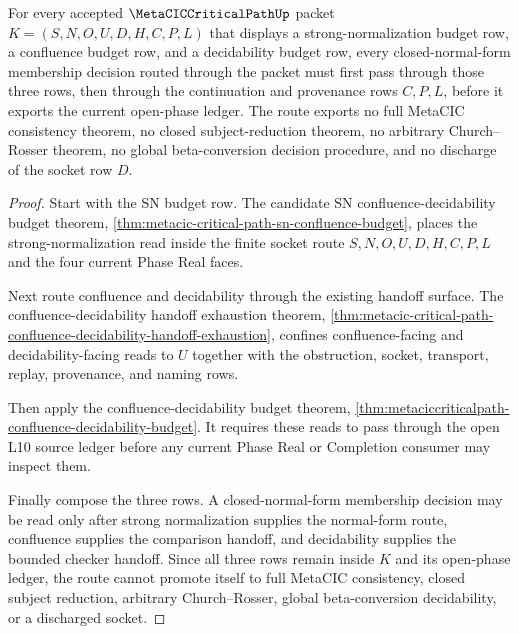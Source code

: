 \begin{theorem}
\label{thm:metacic-critical-path-sn-confluence-decidability-handoff}
For every accepted $\MetaCICCriticalPathUp$ packet $K=(S,N,O,U,D,H,C,P,L)$ that displays a strong-normalization budget row, a confluence budget row, and a decidability budget row, every closed-normal-form membership decision routed through the packet must first pass through those three rows, then through the continuation and provenance rows $C,P,L$, before it exports the current open-phase ledger. The route exports no full MetaCIC consistency theorem, no closed subject-reduction theorem, no arbitrary Church--Rosser theorem, no global beta-conversion decision procedure, and no discharge of the socket row $D$.
\end{theorem}
\begin{proof}
Start with the SN budget row. The candidate SN confluence-decidability budget theorem, \autoref{thm:metacic-critical-path-sn-confluence-budget}, places the strong-normalization read inside the finite socket route $S,N,O,U,D,H,C,P,L$ and the four current Phase Real faces.

Next route confluence and decidability through the existing handoff surface. The confluence-decidability handoff exhaustion theorem, \autoref{thm:metacic-critical-path-confluence-decidability-handoff-exhaustion}, confines confluence-facing and decidability-facing reads to $U$ together with the obstruction, socket, transport, replay, provenance, and naming rows.

Then apply the confluence-decidability budget theorem, \autoref{thm:metaciccriticalpath-confluence-decidability-budget}. It requires these reads to pass through the open L10 source ledger before any current Phase Real or Completion consumer may inspect them.

Finally compose the three rows. A closed-normal-form membership decision may be read only after strong normalization supplies the normal-form route, confluence supplies the comparison handoff, and decidability supplies the bounded checker handoff. Since all three rows remain inside $K$ and its open-phase ledger, the route cannot promote itself to full MetaCIC consistency, closed subject reduction, arbitrary Church--Rosser, global beta-conversion decidability, or a discharged socket.
\end{proof}
